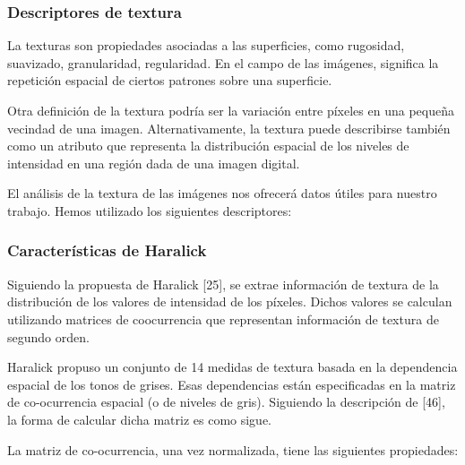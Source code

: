 \subsubsection{Descriptores de textura}
La texturas son propiedades asociadas a las superficies, como rugosidad, suavizado, granularidad, regularidad. En el campo de las imágenes, significa la repetición espacial de ciertos patrones sobre una superficie.

Otra definición de la textura podría ser la variación entre píxeles en una pequeña vecindad de una imagen. Alternativamente, la textura puede describirse también como un atributo que representa la distribución espacial de los niveles de intensidad en una región dada de una imagen digital.


El análisis de la textura de las imágenes nos ofrecerá datos útiles para nuestro trabajo. Hemos utilizado los siguientes descriptores:

\subsubsection*{Características de Haralick}
Siguiendo la propuesta de Haralick [25], se extrae información de textura de la distribución de los valores de intensidad de los píxeles. Dichos valores se calculan utilizando matrices de coocurrencia que representan información de textura de segundo orden.

Haralick propuso un conjunto de 14 medidas de textura basada en la dependencia espacial de los tonos de grises. Esas dependencias están especificadas en la matriz de co-ocurrencia espacial (o de niveles de gris). Siguiendo la descripción de [46], la forma de calcular dicha matriz es como sigue.

La matriz de co-ocurrencia, una vez normalizada, tiene las siguientes propiedades:

